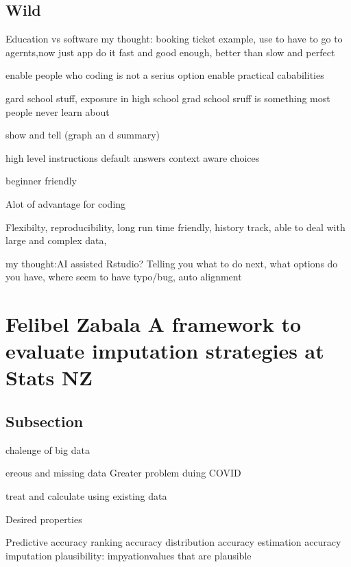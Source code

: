 \documentclass[
]{book}
\begin{document}
\hypertarget{wild}{%
\section{Wild}\label{wild}}

Education vs software
my thought: booking ticket example, use to have to go to agernts,now just app
do it fast and good enough, better than slow and perfect

enable people who coding is not a serius option
enable practical cababilities

gard school stuff, exposure in high school
grad school sruff is something most people never learn about

show and tell (graph an d summary)

high level instructions
default answers
context aware choices

beginner friendly

Alot of advantage for coding

Flexibilty, reproducibility, long run time friendly, history track, able to deal with large and complex data,

my thought:AI assisted Rstudio? Telling you what to do next, what options do you have, where seem to have typo/bug, auto alignment

\hypertarget{felibel-zabala-a-framework-to-evaluate-imputation-strategies-at-stats-nz}{%
\chapter*{Felibel Zabala \textbar{} A framework to evaluate imputation strategies at Stats NZ}\label{felibel-zabala-a-framework-to-evaluate-imputation-strategies-at-stats-nz}}

\hypertarget{subsection}{%
\section{Subsection}\label{subsection}}

chalenge of big data

ereous and missing data
Greater problem duing COVID

treat and calculate using existing data

Desired properties

Predictive accuracy
ranking accuracy
distribution accuracy
estimation accuracy
imputation plausibility: impyationvalues that are plausible
\end{document}
